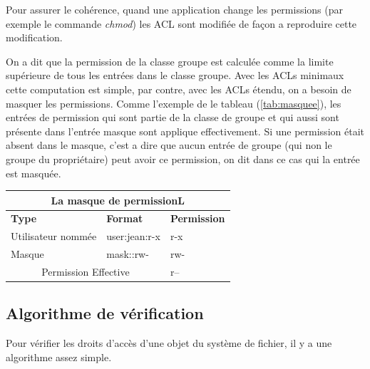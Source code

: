  
Pour assurer le cohérence, quand une application change les permissions (par exemple le commande \emph{chmod}) les ACL sont modifiée de façon a reproduire cette modification.
 
On a dit que la permission de la classe groupe est calculée comme la limite supérieure de tous les entrées dans le classe groupe. Avec les ACLs minimaux cette computation est simple, par contre, avec les ACLs étendu, on a besoin de masquer les permissions. Comme l'exemple de le tableau (\ref{tab:masquee}), les entrées de permission qui sont partie de la classe de groupe et qui aussi sont présente dans l'entrée masque sont applique effectivement. Si une permission était absent dans le masque, c'est a dire que aucun entrée de groupe (qui non le groupe du propriétaire) peut avoir ce permission, on dit dans ce cas qui la entrée est masquée.
 
\begin{center}
\begin{tabular}{|l|l|l|}
  \hline
    \multicolumn{3}{|c|}{La masque de permissionL} \\
  \hline
\textbf{Type} & \textbf{Format} & \textbf{Permission} \\
  \hline
Utilisateur nommée & user:jean:r-x & r-x\\
  \hline
Masque & mask::rw- & rw-\\
  \hline
\multicolumn{2}{|c|}{Permission Effective} & r--\\
  \hline
\end{tabular}
\label{tab:masque}
\end{center}
 
\subsection*{Algorithme de vérification}
 
Pour vérifier les droits d'accès d'une objet du système de fichier, il y a une algorithme assez simple.
 
